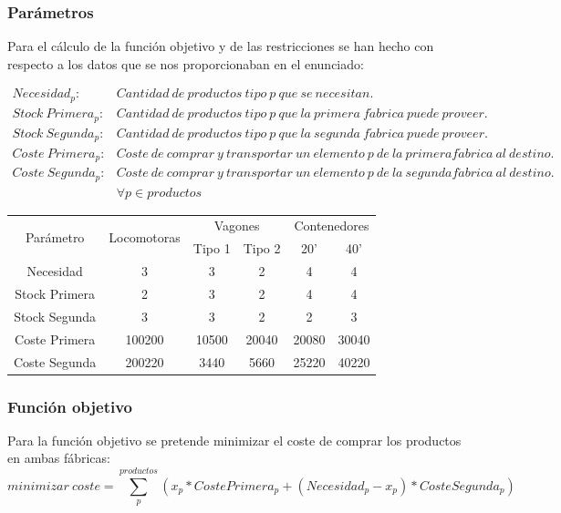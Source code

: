 \documentclass[11pt,spanish]{article}
\begin{document}
			\subsubsection{Parámetros}
			Para el cálculo de la función objetivo y de las restricciones se han hecho con respecto a los datos que se nos proporcionaban en el enunciado:
			
			\begin{align*}
			Necesidad_p:& Cantidad\ de\ productos\ tipo\ p\ que\ se\ necesitan. \\
			Stock\ Primera_p:& Cantidad\ de\ productos\ tipo\ p\ que\ la\ primera\ f\acute{a}brica\ puede\ proveer. \\
			Stock\ Segunda_p:& Cantidad\ de\ productos\ tipo\ p\ que\ la\ segunda\ f\acute{a}brica\ puede\ proveer. \\
			Coste\ Primera_p:& Coste\ de\ comprar\ y\ transportar\ un\ elemento\ p\ de\ la\ primera f\acute{a}brica\ al\ destino. \\
			Coste\ Segunda_p:& Coste\ de\ comprar\ y\ transportar\ un\ elemento\ p\ de\ la\ segunda f\acute{a}brica\ al\ destino. \\
			&\forall p \in productos 
			\end{align*}
			\label{tab:params1}
			\begin{tabular}{ |c||c|c|c|c|c|  }	
			 	\hline
			 	\multirow{2}{*}{Parámetro} & \multirow{2}{*}{Locomotoras} &  \multicolumn{2}{|c|}{Vagones} & \multicolumn{2}{|c|}{Contenedores} \\
			 	& & Tipo 1 & Tipo 2 & 20' & 40'\\
			 	\hline
			 	Necesidad & 3 & 3 & 2 & 4 & 4 \\
			 	Stock Primera & 2 & 3 & 2 & 4 & 4 \\
			 	Stock Segunda & 3 & 3 & 2 & 2 & 3 \\
 			 	Coste Primera & 100200 & 10500 & 20040 & 20080 & 30040 \\
			 	Coste Segunda & 200220 & 3440 & 5660 & 25220 & 40220 \\
				\hline
			\end{tabular}

			\subsubsection{Función objetivo}
			Para la función objetivo se pretende minimizar el coste de comprar los productos en ambas fábricas:
			$$
			minimizar\ coste = \sum_p^{productos} (x_p * Coste Primera_p + (Necesidad_p - x_p) * Coste Segunda_p)
			$$
\end{document}
